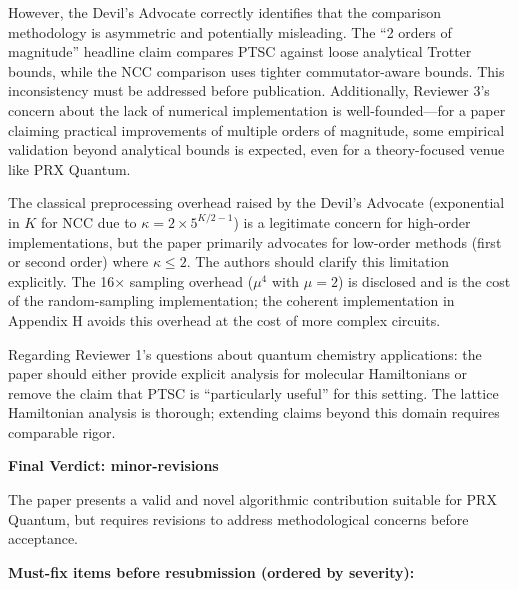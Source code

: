 \documentclass[10pt,letterpaper]{article}
\begin{document}
However, the Devil's Advocate correctly identifies that the comparison methodology is asymmetric and potentially misleading. The ``2 orders of magnitude'' headline claim compares PTSC against loose analytical Trotter bounds, while the NCC comparison uses tighter commutator-aware bounds. This inconsistency must be addressed before publication. Additionally, Reviewer 3's concern about the lack of numerical implementation is well-founded---for a paper claiming practical improvements of multiple orders of magnitude, some empirical validation beyond analytical bounds is expected, even for a theory-focused venue like PRX Quantum.

The classical preprocessing overhead raised by the Devil's Advocate (exponential in \(K\) for NCC due to \(\kappa = 2 \times 5^{K/2-1}\)) is a legitimate concern for high-order implementations, but the paper primarily advocates for low-order methods (first or second order) where \(\kappa \leq 2\). The authors should clarify this limitation explicitly. The 16× sampling overhead (\(\mu^4\) with \(\mu=2\)) is disclosed and is the cost of the random-sampling implementation; the coherent implementation in Appendix H avoids this overhead at the cost of more complex circuits.

Regarding Reviewer 1's questions about quantum chemistry applications: the paper should either provide explicit analysis for molecular Hamiltonians or remove the claim that PTSC is ``particularly useful'' for this setting. The lattice Hamiltonian analysis is thorough; extending claims beyond this domain requires comparable rigor.

\textbf{Final Verdict: minor-revisions}

The paper presents a valid and novel algorithmic contribution suitable for PRX Quantum, but requires revisions to address methodological concerns before acceptance.

\textbf{Must-fix items before resubmission (ordered by severity):}
\end{document}
